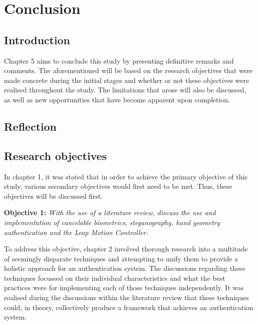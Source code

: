 \chapter{Conclusion}


\section{Introduction}

Chapter 5 aims to conclude this study by presenting definitive remarks and comments. The aforementioned will be based on the research objectives that were made concrete during the initial stages and whether or not these objectives were realised throughout the study. The limitations that arose will also be discussed, as well as new opportunities that have become apparent upon completion.

\section{Reflection}


\section{Research objectives}

In chapter 1, it was stated that in order to achieve the primary objective of this study, various secondary objectives would first need to be met. Thus, these objectives will be discussed first.


\textbf{Objective 1:} \textit{With the use of a literature review, discuss the use and implementation of cancelable biometrics, steganography, hand geometry authentication and the Leap Motion Controller.}


To address this objective, chapter 2 involved thorough research into a multitude of seemingly disparate techniques and attempting to unify them to provide a holistic approach for an authentication system. The discussions regarding these techniques focussed on their individual characteristics and what the best practices were for implementing each of those techniques independently. It was realised during the discussions within the literature review that these techniques could, in theory, collectively produce a framework that achieves an authentication system.



